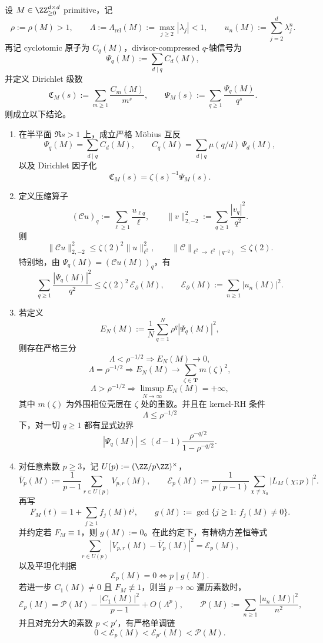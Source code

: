\begin{theorem}\label{thm:conclusion-divisor-qaxis-mobius-hilbert-primevariance}
设 \(M\in \ZZ_{\ge 0}^{d\times d}\) primitive，记
\[
\rho:=\rho(M)>1,
\qquad
\Lambda:=\Lambda_{\mathrm{rel}}(M):=\max_{j\ge 2}|\lambda_j|<1,
\qquad
u_n(M):=\sum_{j=2}^d\lambda_j^n.
\]
再记 cyclotomic 原子为 \(C_q(M)\)，divisor-compressed \(q\)-轴信号为
\[
\Psi_q(M):=\sum_{d\mid q}C_d(M),
\]
并定义 Dirichlet 级数
\[
\mathfrak C_M(s):=\sum_{m\ge 1}\frac{C_m(M)}{m^s},
\qquad
\mathfrak \Psi_M(s):=\sum_{q\ge 1}\frac{\Psi_q(M)}{q^s}.
\]
则成立以下结论。
\begin{enumerate}
  \item 在半平面 \(\Re s>1\) 上，成立严格 Möbius 互反
  \[
  \Psi_q(M)=\sum_{d\mid q}C_d(M),
  \qquad
  C_q(M)=\sum_{d\mid q}\mu(q/d)\,\Psi_d(M),
  \]
  以及 Dirichlet 因子化
  \[
  \mathfrak C_M(s)=\zeta(s)^{-1}\mathfrak \Psi_M(s).
  \]

  \item 定义压缩算子
  \[
  (\mathcal C u)_q:=\sum_{\ell\ge 1}\frac{u_{\ell q}}{\ell},
  \qquad
  \|v\|_{2,-2}^2:=\sum_{q\ge 1}\frac{|v_q|^2}{q^2}.
  \]
  则
  \[
  \|\mathcal C u\|_{2,-2}^2
  \le
  \zeta(2)^2\|u\|_{\ell^2}^2,
  \qquad
  \|\mathcal C\|_{\ell^2\to \ell^2(q^{-2})}\le \zeta(2).
  \]
  特别地，由 \(\Psi_q(M)=(\mathcal C u(M))_q\)，有
  \[
  \sum_{q\ge 1}\frac{|\Psi_q(M)|^2}{q^2}
  \le
  \zeta(2)^2\,\mathcal E_{\partial}(M),
  \qquad
  \mathcal E_{\partial}(M):=\sum_{n\ge 1}|u_n(M)|^2.
  \]

  \item 若定义
  \[
  E_N(M):=\frac1N\sum_{q=1}^N \rho^q|\Psi_q(M)|^2,
  \]
  则存在严格三分
  \[
  \Lambda<\rho^{-1/2}\Longrightarrow E_N(M)\to 0,
  \]
  \[
  \Lambda=\rho^{-1/2}\Longrightarrow
  E_N(M)\to \sum_{\zeta\in\mathbf T}m(\zeta)^2,
  \]
  \[
  \Lambda>\rho^{-1/2}\Longrightarrow
  \limsup_{N\to\infty}E_N(M)=+\infty,
  \]
  其中 \(m(\zeta)\) 为外围相位壳层在 \(\zeta\) 处的重数。并且在 kernel-RH 条件
  \[
  \Lambda\le \rho^{-1/2}
  \]
  下，对一切 \(q\ge 1\) 都有显式边界
  \[
  |\Psi_q(M)|\le (d-1)\frac{\rho^{-q/2}}{1-\rho^{-q/2}}.
  \]

  \item 对任意素数 \(p\ge 3\)，记 \(U(p):=(\ZZ/p\ZZ)^\times\)，
  \[
  \bar V_p(M):=\frac1{p-1}\sum_{r\in U(p)}V_{p,r}(M),
  \qquad
  \mathcal E_p(M):=\frac1{p(p-1)}\sum_{\chi\neq \chi_0}|L_M(\chi;p)|^2.
  \]
  再写
  \[
  F_M(t)=1+\sum_{j\ge 1}f_j(M)t^j,
  \qquad
  g(M):=\gcd\{j\ge 1:\ f_j(M)\neq 0\}.
  \]
  并约定若 \(F_M\equiv 1\)，则 \(g(M):=0\)。在此约定下，有精确方差恒等式
  \[
  \sum_{r\in U(p)}|V_{p,r}(M)-\bar V_p(M)|^2
  =
  \mathcal E_p(M),
  \]
  以及平坦化判据
  \[
  \mathcal E_p(M)=0\iff p\mid g(M).
  \]
  若进一步 \(C_1(M)\neq 0\) 且 \(F_M\not\equiv 1\)，则当 \(p\to\infty\) 遍历素数时，
  \[
  \mathcal E_p(M)
  =
  \mathcal P(M)-\frac{|C_1(M)|^2}{p-1}+O(\Lambda^p),
  \qquad
  \mathcal P(M):=\sum_{n\ge 1}\frac{|u_n(M)|^2}{n^2},
  \]
  并且对充分大的素数 \(p<p'\)，有严格单调链
  \[
  0<\mathcal E_p(M)<\mathcal E_{p'}(M)<\mathcal P(M).
  \]
\end{enumerate}
\end{theorem}
